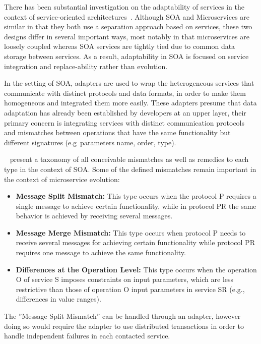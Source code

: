 There has been substantial investigation on the adaptability of services in the context of service-oriented architectures~\cite{adaptersWebServices}.
Although SOA and Microservices are similar in that they both use a separation approach based on services,
these two designs differ in several important ways, most notably in that microservices are loosely coupled whereas SOA services are tightly tied due to common data storage between services.
As a result, adaptability in SOA is focused on service integration and replace-ability rather than evolution.

In the setting of SOA, adapters are used to wrap the heterogeneous services that communicate with distinct protocols and data formats,
in order to make them homogeneous and integrated them more easily.
These adapters presume that data adaptation has already been established by developers at an upper layer,
their primary concern is integrating services with distinct communication protocols and mismatches between operations that have the
same functionality but different signatures (e.g\ parameters name, order, type).

\citeauthor{adaptersWebServices}~\cite{adaptersWebServices} present a taxonomy of all conceivable mismatches as well as remedies to each type in the context of SOA.
Some of the defined mismatches remain important in the context of microservice evolution:
\begin{itemize}
    \item \textbf{Message Split Mismatch:} This type occurs when the protocol P requires a single message to achieve certain functionality,
    while in protocol PR the same behavior is achieved by receiving several messages.
    \item \textbf{Message Merge Mismatch:} This type occurs when protocol P needs to receive several messages for achieving certain
    functionality while protocol PR requires one message to achieve the same functionality.
    \item \textbf{Differences at the Operation Level:} This type occurs when the operation O of service S imposes constraints on input parameters,
    which are less restrictive than those of operation O input parameters in service SR (e.g., differences in value ranges).
\end{itemize}

The ''Message Split Mismatch'' can be handled through an adapter, however doing so
would require the adapter to use distributed transactions in order to handle independent failures in each contacted service.

